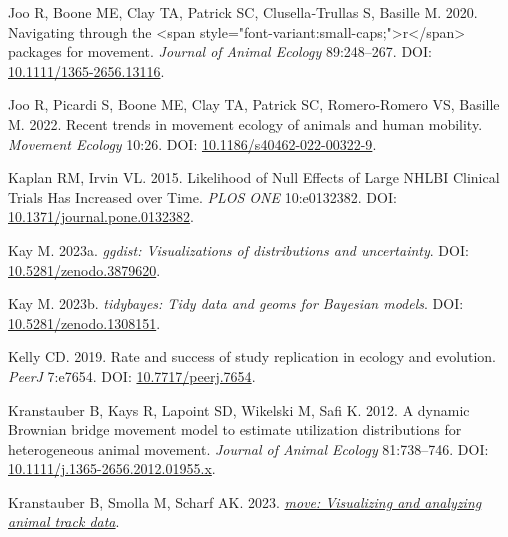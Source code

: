 \documentclass[10pt,a4paper]{article}
\newlength{\cslhangindent}
\newlength{\cslentryspacingunit} %
\newenvironment{CSLReferences}[2] %
 {%
  \setlength{\parindent}{0pt}
  \ifodd #1
  \let\oldpar\par
  \def\par{\hangindent=\cslhangindent\oldpar}
  \fi
  \setlength{\parskip}{#2\cslentryspacingunit}
 }%
 {}
\begin{document}
\begin{CSLReferences}{1}{0}
\leavevmode{}%
Joo R, Boone ME, Clay TA, Patrick SC, Clusella‐Trullas S, Basille M. 2020. Navigating through the {\textless{}}span style="font-variant:small-caps;"{\textgreater{}}r{\textless{}}/span{\textgreater{}} packages for movement. \emph{Journal of Animal Ecology} 89:248--267. DOI: \href{https://doi.org/10.1111/1365-2656.13116}{10.1111/1365-2656.13116}.

\leavevmode{}%
Joo R, Picardi S, Boone ME, Clay TA, Patrick SC, Romero-Romero VS, Basille M. 2022. Recent trends in movement ecology of animals and human mobility. \emph{Movement Ecology} 10:26. DOI: \href{https://doi.org/10.1186/s40462-022-00322-9}{10.1186/s40462-022-00322-9}.

\leavevmode{}%
Kaplan RM, Irvin VL. 2015. Likelihood of {Null} {Effects} of {Large} {NHLBI} {Clinical} {Trials} {Has} {Increased} over {Time}. \emph{PLOS ONE} 10:e0132382. DOI: \href{https://doi.org/10.1371/journal.pone.0132382}{10.1371/journal.pone.0132382}.

\leavevmode{}%
Kay M. 2023a. \emph{{ggdist}: Visualizations of distributions and uncertainty}. DOI: \href{https://doi.org/10.5281/zenodo.3879620}{10.5281/zenodo.3879620}.

\leavevmode{}%
Kay M. 2023b. \emph{{tidybayes}: Tidy data and geoms for {Bayesian} models}. DOI: \href{https://doi.org/10.5281/zenodo.1308151}{10.5281/zenodo.1308151}.

\leavevmode{}%
Kelly CD. 2019. Rate and success of study replication in ecology and evolution. \emph{PeerJ} 7:e7654. DOI: \href{https://doi.org/10.7717/peerj.7654}{10.7717/peerj.7654}.

\leavevmode{}%
Kranstauber B, Kays R, Lapoint SD, Wikelski M, Safi K. 2012. A dynamic {Brownian} bridge movement model to estimate utilization distributions for heterogeneous animal movement. \emph{Journal of Animal Ecology} 81:738--746. DOI: \href{https://doi.org/10.1111/j.1365-2656.2012.01955.x}{10.1111/j.1365-2656.2012.01955.x}.

\leavevmode{}%
Kranstauber B, Smolla M, Scharf AK. 2023. \emph{\href{https://CRAN.R-project.org/package=move}{{move}: Visualizing and analyzing animal track data}}.


\end{CSLReferences}
\end{document}
